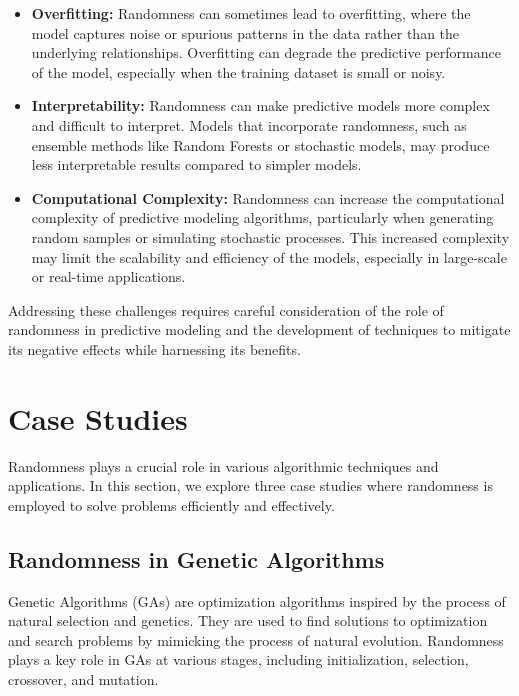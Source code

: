 \documentclass[12pt]{book} %
\begin{document}
\begin{itemize}
    \item \textbf{Overfitting:} Randomness can sometimes lead to overfitting, where the model captures noise or spurious patterns in the data rather than the underlying relationships. Overfitting can degrade the predictive performance of the model, especially when the training dataset is small or noisy.
    
    \item \textbf{Interpretability:} Randomness can make predictive models more complex and difficult to interpret. Models that incorporate randomness, such as ensemble methods like Random Forests or stochastic models, may produce less interpretable results compared to simpler models.
    
    \item \textbf{Computational Complexity:} Randomness can increase the computational complexity of predictive modeling algorithms, particularly when generating random samples or simulating stochastic processes. This increased complexity may limit the scalability and efficiency of the models, especially in large-scale or real-time applications.
\end{itemize}

Addressing these challenges requires careful consideration of the role of randomness in predictive modeling and the development of techniques to mitigate its negative effects while harnessing its benefits.


\section{Case Studies}

Randomness plays a crucial role in various algorithmic techniques and applications. In this section, we explore three case studies where randomness is employed to solve problems efficiently and effectively.

\subsection{Randomness in Genetic Algorithms}

Genetic Algorithms (GAs) are optimization algorithms inspired by the process of natural selection and genetics. They are used to find solutions to optimization and search problems by mimicking the process of natural evolution. Randomness plays a key role in GAs at various stages, including initialization, selection, crossover, and mutation.
\end{document}
